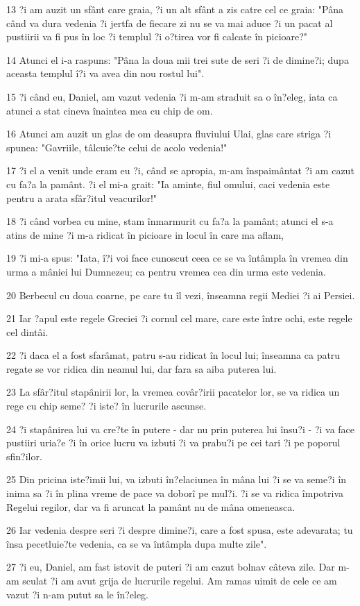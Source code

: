 \par 13 ?i am auzit un sfânt care graia, ?i un alt sfânt a zis catre cel ce graia: "Pâna când va dura vedenia ?i jertfa de fiecare zi nu se va mai aduce ?i un pacat al pustiirii va fi pus în loc ?i templul ?i o?tirea vor fi calcate în picioare?"
\par 14 Atunci el i-a raspuns: "Pâna la doua mii trei sute de seri ?i de dimine?i; dupa aceasta templul î?i va avea din nou rostul lui".
\par 15 ?i când eu, Daniel, am vazut vedenia ?i m-am straduit sa o în?eleg, iata ca atunci a stat cineva înaintea mea cu chip de om.
\par 16 Atunci am auzit un glas de om deasupra fluviului Ulai, glas care striga ?i spunea: "Gavriile, tâlcuie?te celui de acolo vedenia!"
\par 17 ?i el a venit unde eram eu ?i, când se apropia, m-am înspaimântat ?i am cazut cu fa?a la pamânt. ?i el mi-a grait: "Ia aminte, fiul omului, caci vedenia este pentru a arata sfâr?itul veacurilor!"
\par 18 ?i când vorbea cu mine, stam înmarmurit cu fa?a la pamânt; atunci el s-a atins de mine ?i m-a ridicat în picioare in locul în care ma aflam,
\par 19 ?i mi-a spus: "Iata, î?i voi face cunoscut ceea ce se va întâmpla în vremea din urma a mâniei lui Dumnezeu; ca pentru vremea cea din urma este vedenia.
\par 20 Berbecul cu doua coarne, pe care tu îl vezi, înseamna regii Mediei ?i ai Persiei.
\par 21 Iar ?apul este regele Greciei ?i cornul cel mare, care este între ochi, este regele cel dintâi.
\par 22 ?i daca el a fost sfarâmat, patru s-au ridicat în locul lui; înseamna ca patru regate se vor ridica din neamul lui, dar fara sa aiba puterea lui.
\par 23 La sfâr?itul stapânirii lor, la vremea covâr?irii pacatelor lor, se va ridica un rege cu chip seme? ?i iste? în lucrurile ascunse.
\par 24 ?i stapânirea lui va cre?te în putere - dar nu prin puterea lui însu?i - ?i va face pustiiri uria?e ?i în orice lucru va izbuti ?i va prabu?i pe cei tari ?i pe poporul sfin?ilor.
\par 25 Din pricina iste?imii lui, va izbuti în?elaciunea în mâna lui ?i se va seme?i în inima sa ?i în plina vreme de pace va doborî pe mul?i. ?i se va ridica împotriva Regelui regilor, dar va fi aruncat la pamânt nu de mâna omeneasca.
\par 26 Iar vedenia despre seri ?i despre dimine?i, care a fost spusa, este adevarata; tu însa pecetluie?te vedenia, ca se va întâmpla dupa multe zile".
\par 27 ?i eu, Daniel, am fast istovit de puteri ?i am cazut bolnav câteva zile. Dar m-am sculat ?i am avut grija de lucrurile regelui. Am ramas uimit de cele ce am vazut ?i n-am putut sa le în?eleg.

